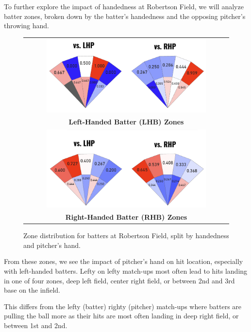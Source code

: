 \documentclass{article}
\begin{document}
To further explore the impact of handedness at Robertson Field, we will analyze batter zones, broken down by the batter's handedness and the opposing pitcher's throwing hand.

\newpage
\begin{figure}[h]
    \centering
    \begin{tabular}{c}  
        \includegraphics[width=0.8\textwidth]{images/LHB2024_zones_Robertson.png} \\
        \textbf{Left-Handed Batter (LHB) Zones} \\[1em]  
        \includegraphics[width=0.8\textwidth]{images/RHB2024_zones__Robertson.png} \\
        \textbf{Right-Handed Batter (RHB) Zones} 
    \end{tabular}
    \caption{Zone distribution for batters at Robertson Field, split by handedness and pitcher’s hand.}
    \label{fig:batting_zones}
\end{figure}
\vspace{.7cm}

From these zones, we see the impact of pitcher's hand on hit location, especially with left-handed batters. Lefty on lefty match-ups most often lead to hits landing in one of four zones, deep left field, center right field, or between 2nd and 3rd base on the infield. 

This differs from the lefty (batter) righty (pitcher) match-ups where batters are pulling the ball more as their hits are most often landing in deep right field, or between 1st and 2nd. 
\end{document}
